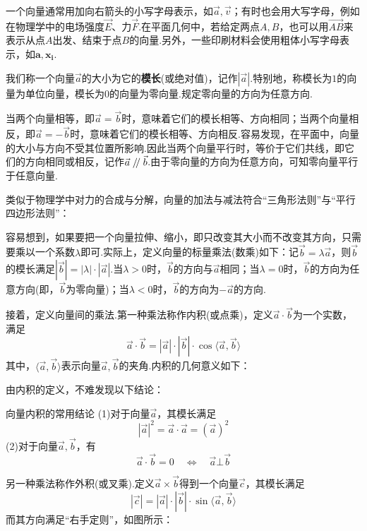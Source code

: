 \documentclass[lang=cn, zihao=5]{elegantbook}
\newcommand{\xl}[1]{\overrightarrow{#1}}
\newcommand{\pll}{\kern 0.56em/\kern -0.8em /\kern 0.56em}
\begin{document}
一个向量通常用加向右箭头的小写字母表示，如$\vec{a},\vec{v}$；有时也会用大写字母，例如在物理学中的电场强度$\vec{E}$、力$\vec{F}$.在平面几何中，若给定两点$A,B$，也可以用$\xl{AB}$来表示从点$A$出发、结束于点$B$的向量.另外，一些印刷材料会使用粗体小写字母表示，如$\boldsymbol{a},\boldsymbol{x_i}$.

我们称一个向量$\vec{a}$的大小为它的\textbf{模长}(或绝对值)，记作$|\vec{a}|$.特别地，称模长为$1$的向量为单位向量，模长为$0$的向量为零向量.规定零向量的方向为任意方向.

当两个向量相等，即$\vec{a}=\vec{b}$时，意味着它们的模长相等、方向相同；当两个向量相反，即$\vec{a}=-\vec{b}$时，意味着它们的模长相等、方向相反.容易发现，在平面中，向量的大小与方向不受其位置所影响.因此当两个向量平行时，等价于它们共线，即它们的方向相同或相反，记作$\vec{a} \pll \vec{b}$.由于零向量的方向为任意方向，可知零向量平行于任意向量.

类似于物理学中对力的合成与分解，向量的加法与减法符合“三角形法则”与“平行四边形法则”：


容易想到，如果要把一个向量拉伸、缩小，即只改变其大小而不改变其方向，只需要乘以一个系数$\lambda$即可.实际上，定义向量的标量乘法(数乘)如下：记$\vec{b}=\lambda \vec{a}$，则$\vec{b}$的模长满足$|\vec{b}|=|\lambda | \cdot |\vec{a}|$.当$\lambda > 0$时，$\vec{b}$的方向与$\vec{a}$相同；当$\lambda = 0$时，$\vec{b}$的方向为任意方向(即，$\vec{b}$为零向量)；当$\lambda < 0$时，$\vec{b}$的方向为$-\vec{a}$的方向.

接着，定义向量间的乘法.第一种乘法称作内积(或点乘)，定义$\vec{a} \cdot \vec{b}$为一个实数，满足$$\vec{a} \cdot \vec{b} = |\vec{a}| \cdot |\vec{b}| \cdot \cos \langle \vec{a},\vec{b} \rangle$$
其中，$\langle \vec{a},\vec{b} \rangle$表示向量$\vec{a},\vec{b}$的夹角.内积的几何意义如下：


由内积的定义，不难发现以下结论：

\begin{proposition}{向量内积的常用结论}
	(1)对于向量$\vec{a}$，其模长满足$$|\vec{a}|^2=\vec{a} \cdot \vec{a} = (\vec{a})^2$$
	(2)对于向量$\vec{a},\vec{b}$，有$$\vec{a} \cdot \vec{b} = 0 \quad \Longleftrightarrow \quad \vec{a} \bot \vec{b}$$
\end{proposition}

另一种乘法称作外积(或叉乘).定义$\vec{a} \times \vec{b}$得到一个向量$\vec{c}$，其模长满足$$|\vec{c}|=|\vec{a}| \cdot |\vec{b}| \cdot \sin \langle \vec{a},\vec{b} \rangle $$
而其方向满足“右手定则”，如图所示：
\end{document}
